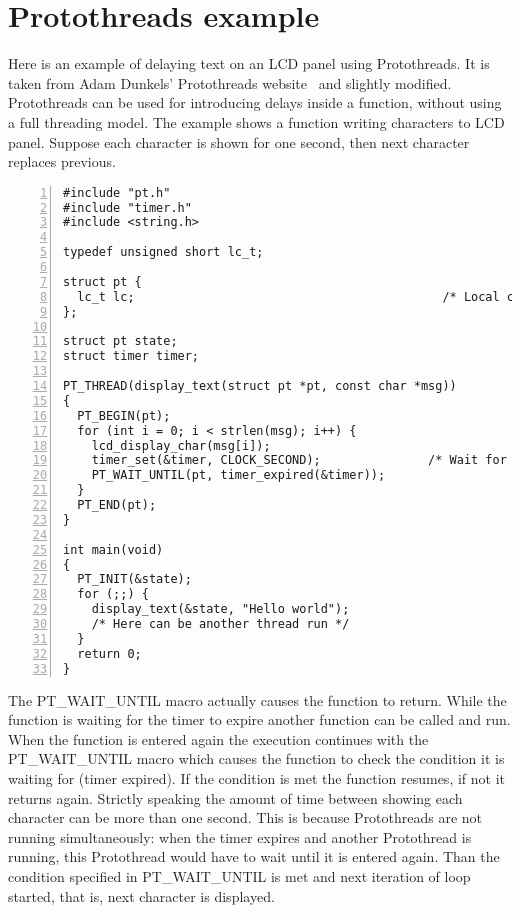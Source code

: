 

\chapter{Protothreads example}\label{app:protothreads}
Here is
an example of delaying text on an LCD panel using Protothreads.
It is taken from
Adam Dunkels' Protothreads website~\cite{adam-protothreads} and slightly modified.
Protothreads can be used for introducing delays inside a function, without using a full threading model.
The example shows a function writing characters to LCD panel.
Suppose each character is shown for one second, then next character replaces previous.
\begin{lstlisting}[numbers=left]
#include "pt.h"
#include "timer.h"
#include <string.h>

typedef unsigned short lc_t;

struct pt {
  lc_t lc;                                           /* Local continuation */
}; 

struct pt state;
struct timer timer;
 
PT_THREAD(display_text(struct pt *pt, const char *msg))
{
  PT_BEGIN(pt);
  for (int i = 0; i < strlen(msg); i++) {
    lcd_display_char(msg[i]);
    timer_set(&timer, CLOCK_SECOND);               /* Wait for one second. */
    PT_WAIT_UNTIL(pt, timer_expired(&timer));
  }
  PT_END(pt);
}

int main(void)
{
  PT_INIT(&state);
  for (;;) {
    display_text(&state, "Hello world");
    /* Here can be another thread run */
  }
  return 0;
}
\end{lstlisting}
The PT\_WAIT\_UNTIL macro actually causes the function to return.
While the function is waiting for the timer to expire another function can be called and run.
When the function is entered again the execution continues with the PT\_WAIT\_UNTIL macro
which causes the function to check the condition it is waiting for (timer expired).
If the condition is met the function resumes, if not it returns again.
Strictly speaking the amount of time between showing each character can
be more than one second.
This is because Protothreads are not running simultaneously: when the timer expires
and another Protothread is running, this Protothread would have to wait until
it is entered again. Than the condition specified in PT\_WAIT\_UNTIL is met and
next iteration of loop started, that is, next character is displayed.

